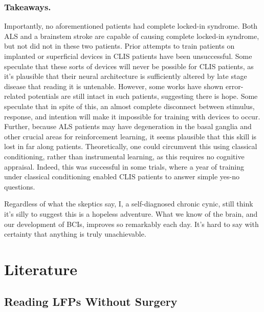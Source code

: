 \subsubsection{Takeaways.}

Importantly, no aforementioned patients had complete locked-in syndrome. Both ALS and a brainstem stroke are capable of causing complete locked-in syndrome, but not did not in these two patients. Prior attempts to train patients on implanted or superficial devices in CLIS patients have been unsuccessful. Some speculate that these sorts of devices will never be possible for CLIS patients, as it's plausible that their neural architecture is sufficiently altered by late stage disease that reading it is untenable. However, some works have shown error-related potentials are still intact in such patients, suggesting there is hope. Some speculate that in spite of this, an almost complete disconnect between stimulus, response, and intention will make it impossible for training with devices to occur. Further, because ALS patients may have degeneration in the basal ganglia and other crucial areas for reinforcement learning, it seems plausible that this skill is lost in far along patients. Theoretically, one could circumvent this using classical conditioning, rather than instrumental learning, as this requires no cognitive appraisal. Indeed, this was successful in some trials, where a year of training under classical conditioning enabled CLIS patients to answer simple yes-no questions. \newline

Regardless of what the skeptics say, I, a self-diagnosed chronic cynic, still think it's silly to suggest this is a hopeless adventure. What we know of the brain, and our development of BCIs, improves so remarkably each day. It's hard to say with certainty that anything is truly unachievable.  

\section{Literature}

\subsection{Reading LFPs Without Surgery}

